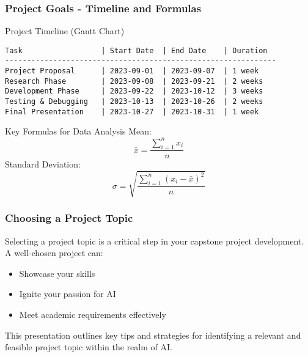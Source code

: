 \documentclass[aspectratio=169]{beamer}
\begin{document}
\begin{frame}[fragile]
    \frametitle{Project Goals - Timeline and Formulas}
    \begin{block}{Project Timeline (Gantt Chart)}
        \begin{verbatim}
Task                  | Start Date  | End Date    | Duration
--------------------------------------------------------------
Project Proposal      | 2023-09-01  | 2023-09-07  | 1 week
Research Phase        | 2023-09-08  | 2023-09-21  | 2 weeks
Development Phase     | 2023-09-22  | 2023-10-12  | 3 weeks
Testing & Debugging   | 2023-10-13  | 2023-10-26  | 2 weeks
Final Presentation    | 2023-10-27  | 2023-10-31  | 1 week
        \end{verbatim}
    \end{block}

    \begin{block}{Key Formulas for Data Analysis}
        Mean: 
        \begin{equation}
            \bar{x} = \frac{\sum_{i=1}^{n} x_i}{n}
        \end{equation}
        Standard Deviation: 
        \begin{equation}
            \sigma = \sqrt{\frac{\sum_{i=1}^{n} (x_i - \bar{x})^2}{n}}
        \end{equation}
    \end{block}
\end{frame}

\begin{frame}[fragile]
    \frametitle{Choosing a Project Topic}
    Selecting a project topic is a critical step in your capstone project development. A well-chosen project can:
    \begin{itemize}
        \item Showcase your skills
        \item Ignite your passion for AI
        \item Meet academic requirements effectively
    \end{itemize}
    This presentation outlines key tips and strategies for identifying a relevant and feasible project topic within the realm of AI.
\end{frame}
\end{document}
